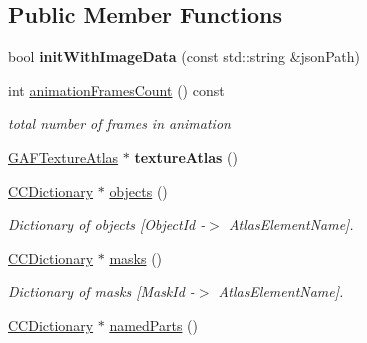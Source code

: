 \subsection*{Public Member Functions}
\begin{DoxyCompactItemize}
\item 
\hypertarget{class_g_a_f_1_1_g_a_f_asset_a4f0ec3dad0ad82b5c7963a7ac26c7372}{bool {\bfseries init\-With\-Image\-Data} (const std\-::string \&json\-Path)}\label{class_g_a_f_1_1_g_a_f_asset_a4f0ec3dad0ad82b5c7963a7ac26c7372}

\item 
\hypertarget{class_g_a_f_1_1_g_a_f_asset_ac8b3c99a8a082a02d32168a6e6720da2}{int \hyperlink{class_g_a_f_1_1_g_a_f_asset_ac8b3c99a8a082a02d32168a6e6720da2}{animation\-Frames\-Count} () const }\label{class_g_a_f_1_1_g_a_f_asset_ac8b3c99a8a082a02d32168a6e6720da2}

\begin{DoxyCompactList}\small\item\em total number of frames in animation \end{DoxyCompactList}\item 
\hypertarget{class_g_a_f_1_1_g_a_f_asset_a9fced4b3b2f2060fcd5a18ef4d584fc6}{\hyperlink{class_g_a_f_1_1_g_a_f_texture_atlas}{G\-A\-F\-Texture\-Atlas} $\ast$ {\bfseries texture\-Atlas} ()}\label{class_g_a_f_1_1_g_a_f_asset_a9fced4b3b2f2060fcd5a18ef4d584fc6}

\item 
\hypertarget{class_g_a_f_1_1_g_a_f_asset_a7313ebc47dc135db64e11ff8d78f100e}{\hyperlink{class_g_a_f_1_1_c_c_dictionary}{C\-C\-Dictionary} $\ast$ \hyperlink{class_g_a_f_1_1_g_a_f_asset_a7313ebc47dc135db64e11ff8d78f100e}{objects} ()}\label{class_g_a_f_1_1_g_a_f_asset_a7313ebc47dc135db64e11ff8d78f100e}

\begin{DoxyCompactList}\small\item\em Dictionary of objects \mbox{[}Object\-Id -\/$>$ Atlas\-Element\-Name\mbox{]}. \end{DoxyCompactList}\item 
\hypertarget{class_g_a_f_1_1_g_a_f_asset_a1b82f9cf2556eeb8f642d1f2317d66af}{\hyperlink{class_g_a_f_1_1_c_c_dictionary}{C\-C\-Dictionary} $\ast$ \hyperlink{class_g_a_f_1_1_g_a_f_asset_a1b82f9cf2556eeb8f642d1f2317d66af}{masks} ()}\label{class_g_a_f_1_1_g_a_f_asset_a1b82f9cf2556eeb8f642d1f2317d66af}

\begin{DoxyCompactList}\small\item\em Dictionary of masks \mbox{[}Mask\-Id -\/$>$ Atlas\-Element\-Name\mbox{]}. \end{DoxyCompactList}\item 
\hypertarget{class_g_a_f_1_1_g_a_f_asset_a7e9ebad7448f699ef459227093086fe2}{\hyperlink{class_g_a_f_1_1_c_c_dictionary}{C\-C\-Dictionary} $\ast$ \hyperlink{class_g_a_f_1_1_g_a_f_asset_a7e9ebad7448f699ef459227093086fe2}{named\-Parts} ()}\label{class_g_a_f_1_1_g_a_f_asset_a7e9ebad7448f699ef459227093086fe2}


\end{DoxyCompactItemize}
